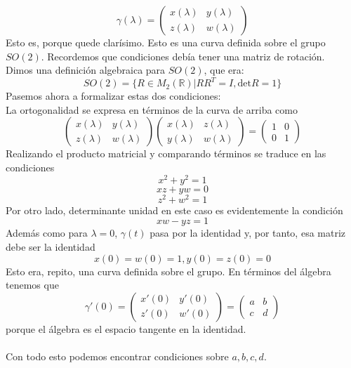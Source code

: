 \documentclass[12pt]{article}
\begin{document}
$$\gamma(\lambda)= \begin{pmatrix}
	x(\lambda) & y(\lambda) \\
	z(\lambda) & w(\lambda)
\end{pmatrix}$$
Esto es, porque quede clarísimo. Esto es una curva definida sobre el grupo $SO(2)$. 
Recordemos que condiciones debía tener una matriz de rotación.\\ 
Dimos una definición algebraica para $SO(2)$, que era:  
\begin{equation}
    SO(2) =\{R\in M_2(\mathbb{R}) | R R^T=I, \text{det}R =1\}
\end{equation}
Pasemos ahora a formalizar estas dos condiciones:\\
La ortogonalidad se expresa en términos de la curva de arriba como
\begin{equation}
    \begin{pmatrix}
        x(\lambda) & y(\lambda) \\ z(\lambda) & w(\lambda) 
    \end{pmatrix}
        \begin{pmatrix}
        x(\lambda) & z(\lambda)  \\ y(\lambda) & w(\lambda) 
    \end{pmatrix} =\begin{pmatrix}
        1 & 0 \\ 0 & 1 
    \end{pmatrix}
\end{equation}
Realizando el producto matricial y comparando términos se traduce en las condiciones 
$$x^2+y^2=1 $$
$$xz+yw=0$$
$$z^2+w^2=1$$
Por otro lado, determinante unidad en este caso es evidentemente la condición
$$xw-yz=1$$
Además como para $\lambda=0$, $\gamma(t)$ pasa por la identidad y, por tanto, esa matriz debe ser la identidad 
$$x(0)=w(0)=1, y(0)=z(0)=0$$
Esto era, repito, una curva definida sobre el grupo. En términos del álgebra tenemos que
$$\gamma'(0)= \begin{pmatrix}
	x'(0) & y'(0) \\
	z'(0) & w'(0)
\end{pmatrix}= \begin{pmatrix}
	a & b \\
	c & d
\end{pmatrix}$$
porque el álgebra es el espacio tangente en la identidad. \\\\
Con todo esto podemos encontrar condiciones sobre $a, b, c, d$. \\\\
\end{document}
